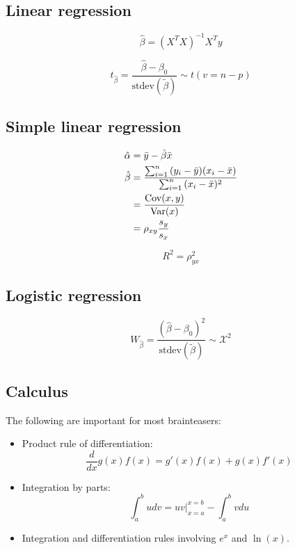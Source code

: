\documentclass[a4paper]{article}
\begin{document}
\begin{multicols}{2}
\subsection*{Linear regression}
\[
    \hat{\beta} = (X^T X)^{-1}X^T y
\]

\[
t_{\hat\beta}  =  \frac{\hat\beta - \beta_0}{ \text{stdev}( \tilde\beta) } \sim t(v=n-p)
\]

\subsection*{Simple linear regression}
\begin{align*}
  \hat{\alpha} &= \bar{y} - \hat\beta \bar{x}  \\
  \hat{\beta} &=
  \frac
  {\sum_{i=1}^{n}{ (y_i - \bar{y}) (x_i - \bar{x}) }}
  {\sum_{i=1}^{n}{ (x_i - \bar{x})^2 }}  \\
  &=
  \frac
  {\operatorname{\mathrm{Cov}}(x, y)}
  {\operatorname{\mathrm{Var}}(x)} \\
  &= \rho_{xy} \frac{s_y}{s_x}
\end{align*}

\[
  R^2 = \rho_{yx}^2
\]

\subsection*{Logistic regression}
\[
W_{\hat\beta}
=  \frac{(\hat\beta - \beta_0)^2}{ \text{stdev}( \tilde\beta) }
\sim \mathcal{X}^2
\]


\subsection*{Calculus}
The following are important for most brainteasers:
\begin{itemize}
  \item
Product rule of differentiation:
\[
  \frac{d}{dx}
  g(x)f(x) =
  g'(x)f(x) +
  g(x)f'(x)
\]

  \item
Integration by parts:
\[
\int_{a}^{b}{ u dv }
=
uv\Big\vert_{x=a}^{x=b} - \int_{a}^{b}{ v du }
\]
  \item
Integration and differentiation rules involving $e^{x}$ and $\ln(x)$.
\end{itemize}


\end{multicols}
\clearpage




{}


%


{}
\printindex
\end{document}
